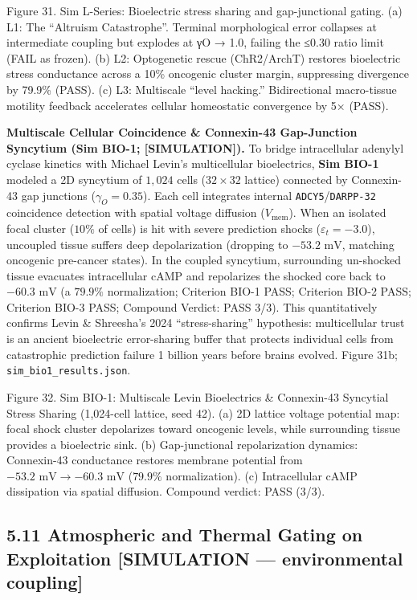 \documentclass[
]{article}
\begin{document}
Figure 31. Sim L-Series: Bioelectric stress sharing and gap-junctional
gating. (a) L1: The ``Altruism Catastrophe''. Terminal morphological
error collapses at intermediate coupling but explodes at {γO → 1.0},
failing the {≤0.30} ratio limit (FAIL as frozen). (b) L2: Optogenetic
rescue (ChR2/ArchT) restores bioelectric stress conductance across a
10\% oncogenic cluster margin, suppressing divergence by 79.9\% (PASS).
(c) L3: Multiscale ``level hacking.'' Bidirectional macro-tissue
motility feedback accelerates cellular homeostatic convergence by 5×
(PASS).

\textbf{Multiscale Cellular Coincidence \& Connexin-43 Gap-Junction
Syncytium (Sim BIO-1; {[}SIMULATION{]}).} To bridge intracellular
adenylyl cyclase kinetics with Michael Levin's multicellular
bioelectrics, \textbf{Sim BIO-1} modeled a 2D syncytium of \(1,024\)
cells (\(32 \times 32\) lattice) connected by Connexin-43 gap junctions
(\(\gamma_O = 0.35\)). Each cell integrates internal
\texttt{ADCY5}/\texttt{DARPP-32} coincidence detection with spatial
voltage diffusion (\(V_{\mathrm{mem}}\)). When an isolated focal cluster
(\(10\%\) of cells) is hit with severe prediction shocks
(\(\varepsilon_t = -3.0\)), uncoupled tissue suffers deep depolarization
(dropping to \(-53.2\text{ mV}\), matching oncogenic pre-cancer states).
In the coupled syncytium, surrounding un-shocked tissue evacuates
intracellular cAMP and repolarizes the shocked core back to
\(-60.3\text{ mV}\) (a \(79.9\%\) normalization; Criterion BIO-1 PASS;
Criterion BIO-2 PASS; Criterion BIO-3 PASS; Compound Verdict: PASS 3/3).
This quantitatively confirms Levin \& Shreesha's 2024 ``stress-sharing''
hypothesis: multicellular trust is an ancient bioelectric error-sharing
buffer that protects individual cells from catastrophic prediction
failure 1 billion years before brains evolved. Figure 31b;
\texttt{sim\_bio1\_results.json}.

Figure 32. Sim BIO-1: Multiscale Levin Bioelectrics \& Connexin-43
Syncytial Stress Sharing (1,024-cell lattice, seed 42). (a) 2D lattice
voltage potential map: focal shock cluster depolarizes toward oncogenic
levels, while surrounding tissue provides a bioelectric sink. (b)
Gap-junctional repolarization dynamics: Connexin-43 conductance restores
membrane potential from \(-53.2\text{ mV} \to -60.3\text{ mV}\)
(\(79.9\%\) normalization). (c) Intracellular cAMP dissipation via
spatial diffusion. Compound verdict: PASS (3/3).

\subsection{5.11 Atmospheric and Thermal Gating on Exploitation
{[}SIMULATION --- environmental
coupling{]}}\label{atmospheric-and-thermal-gating-on-exploitation-simulation-environmental-coupling}
\end{document}
